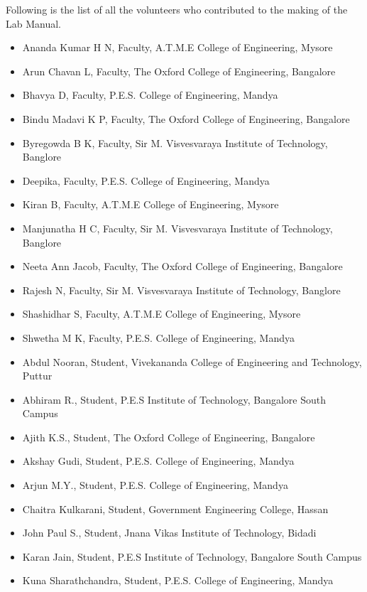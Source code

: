 Following is the list of all the volunteers who contributed to the making of the Lab Manual.

\begin{itemize}
\item
  Ananda Kumar H N, Faculty, A.T.M.E College of Engineering, Mysore
\item
  Arun Chavan L, Faculty, The Oxford College of Engineering, Bangalore
\item
  Bhavya D, Faculty, P.E.S. College of Engineering, Mandya
\item
  Bindu Madavi K P, Faculty, The Oxford College of Engineering,
  Bangalore
\item
  Byregowda B K, Faculty, Sir M. Visvesvaraya Institute of Technology,
  Banglore
\item
  Deepika, Faculty, P.E.S. College of Engineering, Mandya
\item
  Kiran B, Faculty, A.T.M.E College of Engineering, Mysore
\item
  Manjunatha H C, Faculty, Sir M. Visvesvaraya Institute of Technology,
  Banglore
\item
  Neeta Ann Jacob, Faculty, The Oxford College of Engineering, Bangalore
\item
  Rajesh N, Faculty, Sir M. Visvesvaraya Institute of Technology,
  Banglore
\item
  Shashidhar S, Faculty, A.T.M.E College of Engineering, Mysore
\item
  Shwetha M K, Faculty, P.E.S. College of Engineering, Mandya
\item
  Abdul Nooran, Student, Vivekananda College of Engineering and
  Technology, Puttur
\item
  Abhiram R., Student, P.E.S Institute of Technology, Bangalore South
  Campus
\item
  Ajith K.S., Student, The Oxford College of Engineering, Bangalore
\item
  Akshay Gudi, Student, P.E.S. College of Engineering, Mandya
\item
  Arjun M.Y., Student, P.E.S. College of Engineering, Mandya
\item
  Chaitra Kulkarani, Student, Government Engineering College, Hassan
\item
  John Paul S., Student, Jnana Vikas Institute of Technology, Bidadi
\item
  Karan Jain, Student, P.E.S Institute of Technology, Bangalore South
  Campus
\item
  Kuna Sharathchandra, Student, P.E.S. College of Engineering, Mandya

\end{itemize}
